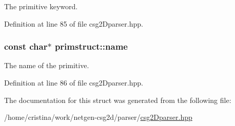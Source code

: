 The primitive keyword. 



Definition at line 85 of file csg2Dparser.hpp.

\hypertarget{structprimstruct_afd12c5b018f006d9f864378a95f02143}{
\subsubsection[{name}]{\setlength{\rightskip}{0pt plus 5cm}const char$\ast$ {\bf primstruct::name}}}
\label{structprimstruct_afd12c5b018f006d9f864378a95f02143}


The name of the primitive. 



Definition at line 86 of file csg2Dparser.hpp.



The documentation for this struct was generated from the following file:\begin{DoxyCompactItemize}
\item 
/home/cristina/work/netgen-\/csg2d/parser/\hyperlink{csg2_dparser_8hpp}{csg2Dparser.hpp}\end{DoxyCompactItemize}
